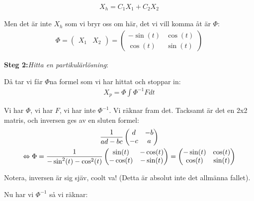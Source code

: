 \begin{equation*}
  \begin{gathered}
    X_h = C_1X_1+C_2X_2
  \end{gathered}
\end{equation*}\par
\noindent Men det är inte $X_h$ som vi bryr oss om här, det vi vill komma åt är $\Phi$:
\begin{equation*}
  \begin{gathered}
    \Phi = \begin{pmatrix}X_1&X_2\end{pmatrix} = \begin{pmatrix}-\sin(t)&\cos(t)\\\cos(t)&\sin(t)\end{pmatrix}
  \end{gathered}
\end{equation*}
\par\bigskip
\noindent\textbf{Steg 2:}\textit{Hitta en partikulärlösning}:
\par\bigskip
\noindent Då tar vi får $\Phi$na formel som vi har hittat och stoppar in:
\begin{equation*}
  \begin{gathered}
    X_p = \Phi\int\Phi^{-1}F dt
  \end{gathered}
\end{equation*}\par
\noindent Vi har $\Phi$, vi har $F$, vi har inte $\Phi^{-1}$. Vi räknar fram det. Tacksamt är det en 2x2 matris, och inversen ges av en sluten formel:
\begin{equation*}
  \begin{gathered}
    \dfrac{1}{ad-bc}\begin{pmatrix}d&-b\\-c&a\end{pmatrix}\\
    \Leftrightarrow \Phi = \dfrac{1}{-\sin^2(t)-\cos^2(t)}\begin{pmatrix}\sin(t)&-\cos(t)\\-\cos(t)&-\sin(t)\end{pmatrix} = \begin{pmatrix}-\sin(t)&\cos(t)\\\cos(t)&\sin(t)\end{pmatrix}
  \end{gathered}
\end{equation*}\par
\noindent Notera, inversen är sig sjäv, coolt va! (Detta är absolut inte det allmänna fallet).\par
\noindent Nu har vi $\Phi^{-1}$ så vi räknar:
\par\bigskip

